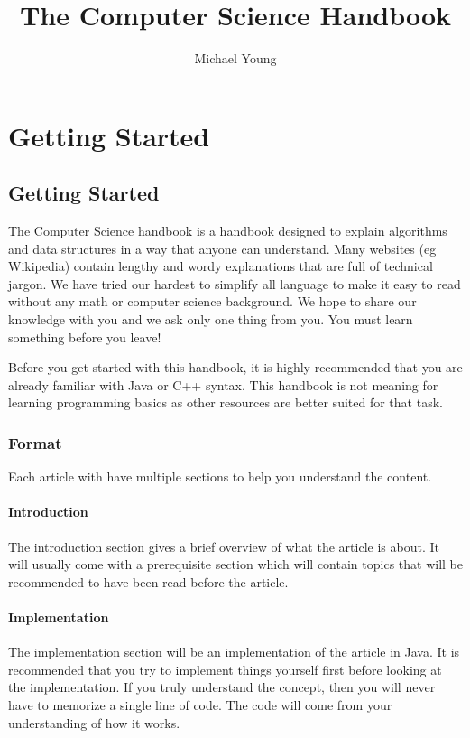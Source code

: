 \documentclass[11pt,oneside]{book}
\title{The Computer Science Handbook}
\author{Michael Young}
\begin{document}
		\maketitle
		\tableofcontents
		\chapter{ Getting Started }
    \section{ Getting Started }
    

The Computer Science handbook is a handbook designed to explain algorithms and data structures in a way that anyone can understand. Many websites (eg Wikipedia) contain lengthy and wordy explanations that are full of technical jargon. We have tried our hardest to simplify all language to make it easy to read without any math or computer science background. We hope to share our knowledge with you and we ask only one thing from you. You must learn something before you leave!

Before you get started with this handbook, it is highly recommended that you are already familiar with Java or C++ syntax. This handbook is not meaning for learning programming basics as other resources are better suited for that task.

\subsection{Format}

Each article with have multiple sections to help you understand the content.

\subsubsection{Introduction}

The introduction section gives a brief overview of what the article is about. It will usually come with a prerequisite section which will contain topics that will be recommended to have been read before the article.

\subsubsection{Implementation}

The implementation section will be an implementation of the article in Java. It is recommended that you try to implement things yourself first before looking at the implementation. If you truly understand the concept, then you will never have to memorize a single line of code. The code will come from your understanding of how it works.
\end{document}
